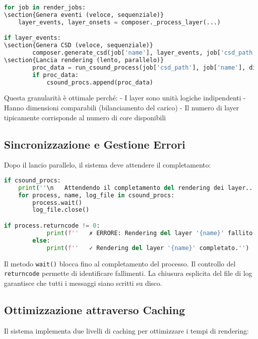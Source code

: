 \begin{lstlisting}[language=Python]
for job in render_jobs:
\section{Genera eventi (veloce, sequenziale)}
    layer_events, layer_onsets = composer._process_layer(...)

if layer_events:
\section{Genera CSD (veloce, sequenziale)}
        composer.generate_csd(job['name'], layer_events, job['csd_path'], job['wav_path'])
\section{Lancia rendering (lento, parallelo)}
        proc_data = run_csound_process(job['csd_path'], job['name'], dirs['logs'])
        if proc_data: 
            csound_procs.append(proc_data)
\end{lstlisting}

Questa granularità è ottimale perché:
- I layer sono unità logiche indipendenti
- Hanno dimensioni comparabili (bilanciamento del carico)
- Il numero di layer tipicamente corrisponde al numero di core disponibili
\subsection{Sincronizzazione e Gestione Errori}
Dopo il lancio parallelo, il sistema deve attendere il completamento:

\begin{lstlisting}[language=Python]
if csound_procs:
    print(''\n   Attendendo il completamento del rendering dei layer...'')
    for process, name, log_file in csound_procs:
        process.wait()
        log_file.close()

if process.returncode != 0:
            print(f''   ✗ ERRORE: Rendering del layer '{name}' fallito!'')
        else:
            print(f''   ✓ Rendering del layer '{name}' completato.'')
\end{lstlisting}

Il metodo \texttt{wait()} blocca fino al completamento del processo. Il controllo del \texttt{returncode} permette di identificare fallimenti. La chiusura esplicita del file di log garantisce che tutti i messaggi siano scritti su disco.
\subsection{Ottimizzazione attraverso Caching}
Il sistema implementa due livelli di caching per ottimizzare i tempi di rendering:

